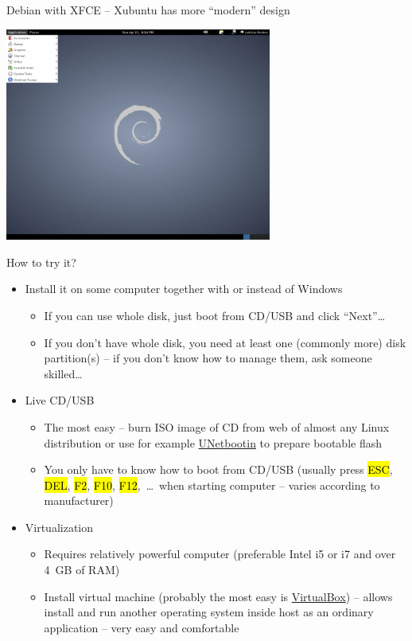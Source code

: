 \documentclass[compress, ucs, xelatex, 11pt, xcolor=svgnames,
  hyperref={
    bookmarks=true,
    unicode=true,
    colorlinks=true,
    pdftitle={Linux, command line and MetaCentrum},
    plainpages=false,
    pdfauthor={Vojtech Zeisek},
    pdfsubject={Course about use of Linux command line, writing shell scripts and using MetaCentrum of CESNET},
    pdfcreator={XeLaTeX},
    pdfkeywords={Linux, GNU, BASH, shell, command line, MetaCentrum},
    linkcolor=Red,
    anchorcolor=Blue,
    citecolor=Purple,
    filecolor=DodgerBlue,
    menucolor=DarkOrchid,
    urlcolor=DeepSkyBlue,
    pdftex},
  url={hyphens, lowtilde} %
  ]{beamer}
\renewcommand{\texttt}[1]{\hl{\ttfamily #1}}
\begin{document}
\begin{frame}{Debian with XFCE -- Xubuntu has more ``modern'' design}
\begin{center}
  \includegraphics[height=7cm]{debian.png}
\end{center}
\end{frame}

\begin{frame}{How to try it?}
\begin{itemize}
  \item Install it on some computer together with or instead of Windows
  \begin{itemize}
    \item If you can use whole disk, just boot from CD/USB and click ``Next''\ldots
    \item If you don't have whole disk, you need at least one (commonly more) disk partition(s) -- if you don't know how to manage them, ask someone skilled\ldots
  \end{itemize}
  \item Live CD/USB
  \begin{itemize}
    \item The most easy -- burn ISO image of CD from web of almost any Linux distribution or use for example \href{https://unetbootin.github.io/}{UNetbootin} to prepare bootable flash
    \item You only have to know how to boot from CD/USB (usually press \texttt{ESC}, \texttt{DEL}, \texttt{F2}, \texttt{F10}, \texttt{F12},~\ldots~when starting computer -- varies according to manufacturer)
  \end{itemize}
  \item Virtualization
  \begin{itemize}
    \item Requires relatively powerful computer (preferable Intel i5 or i7 and over 4~GB of RAM)
    \item Install virtual machine (probably the most easy is \href{https://www.virtualbox.org/}{VirtualBox}) -- allows install and run another operating system inside host as an ordinary application -- very easy and comfortable
  \end{itemize}
\end{itemize}
\end{frame}
\end{document}
